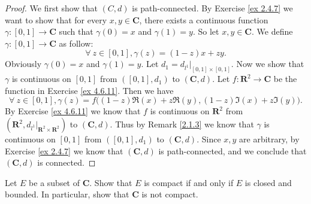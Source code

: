 \begin{proof}
    We first show that \((C, d)\) is path-connected.
    By Exercise \ref{ex 2.4.7} we want to show that for every \(x, y \in \mathbf{C}\), there exists a continuous function \(\gamma : [0, 1] \to \mathbf{C}\) such that \(\gamma(0) = x\) and \(\gamma(1) = y\).
    So let \(x, y \in \mathbf{C}\).
    We define \(\gamma : [0, 1] \to \mathbf{C}\) as follow:
    \[
        \forall\ z \in [0, 1], \gamma(z) = (1 - z)x + zy.
    \]
    Obviously \(\gamma(0) = x\) and \(\gamma(1) = y\).
    Let \(d_1 = d_{l^1}|_{[0, 1] \times [0, 1]}\).
    Now we show that \(\gamma\) is continuous on \([0, 1]\) from \(([0, 1], d_1)\) to \((\mathbf{C}, d)\).
    Let \(f : \mathbf{R}^2 \to \mathbf{C}\) be the function in Exercise \ref{ex 4.6.11}.
    Then we have
    \[
        \forall\ z \in [0, 1], \gamma(z) = f\big((1 - z) \Re(x) + z \Re(y), (1 - z) \Im(x) + z \Im(y)\big).
    \]
    By Exercise \ref{ex 4.6.11} we know that \(f\) is continuous on \(\mathbf{R}^2\) from \((\mathbf{R}^2, d_{l^1}|_{\mathbf{R}^2 \times \mathbf{R}^2})\) to \((\mathbf{C}, d)\).
    Thus by Remark \ref{2.1.3} we know that \(\gamma\) is continuous on \([0, 1]\) from \(([0, 1], d_1)\) to \((\mathbf{C}, d)\).
    Since \(x, y\) are arbitrary, by Exercise \ref{ex 2.4.7} we know that \((\mathbf{C}, d)\) is path-connected, and we conclude that \((\mathbf{C}, d)\) is connected.
\end{proof}

\begin{exercise}\label{ex 4.6.13}
    Let \(E\) be a subset of \(\mathbf{C}\).
    Show that \(E\) is compact if and only if \(E\) is closed and bounded.
    In particular, show that \(\mathbf{C}\) is not compact.
\end{exercise}

